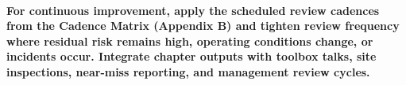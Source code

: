 \paragraph{For continuous improvement, apply the scheduled review cadences from the Cadence Matrix (Appendix B) and tighten review frequency where residual risk remains high, operating conditions change, or incidents occur. Integrate chapter outputs with toolbox talks, site inspections, near-miss reporting, and management review cycles.}

